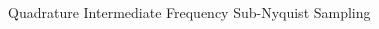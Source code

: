 \documentclass[10pt]{beamer}
\begin{document}
\begin{frame}{Quadrature Intermediate Frequency Sub-Nyquist Sampling}
\begin{columns}[T]
\begin{column}{.5\textwidth}
    \end{column}
  \end{columns}

\end{frame}
\end{document}
